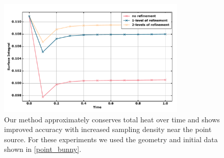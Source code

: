 \documentclass[12pt,openany]{book}
\theoremstyle{plainnormal}
\theoremstyle{remark}
\begin{document}
 \begin{figure}[]
     \centering
     \includegraphics[width=0.8\textwidth]{Figures/accuracyandheatmass.pdf}
    \caption{Our method approximately conserves total heat over time and shows improved accuracy with increased sampling density near the point source. For these experiments we used the geometry and initial data shown in \cref{point_bunny}.}
    \label{mass_conservation}
\end{figure}
\FloatBarrier
\end{document}
